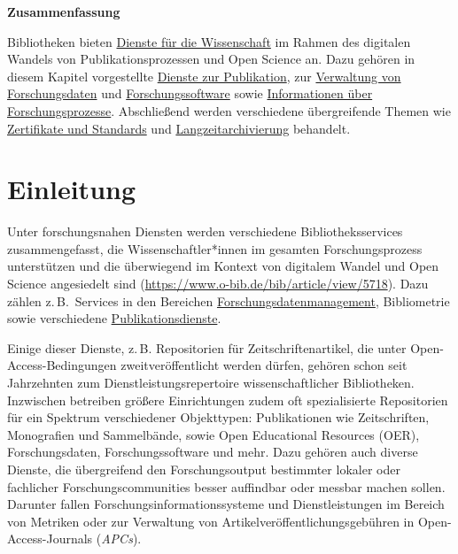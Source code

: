 \documentclass[
  11pt,
  letterpaper,
  DIV=11,
  twoside]{scrreprt}
\begin{document}
\begin{tcolorbox}[enhanced jigsaw, leftrule=.75mm, toprule=.15mm, left=2mm, opacityback=0, arc=.35mm, colback=white, breakable, colframe=quarto-callout-note-color-frame, rightrule=.15mm, bottomrule=.15mm]
\begin{minipage}[t]{5.5mm}
\textcolor{quarto-callout-note-color}{\faInfo}
\end{minipage}%
\begin{minipage}[t]{\textwidth - 5.5mm}

\vspace{-3mm}\textbf{Zusammenfassung}\vspace{3mm}

Bibliotheken bieten \hyperref[einleitung]{Dienste für die Wissenschaft}
im Rahmen des digitalen Wandels von Publikationsprozessen und Open
Science an. Dazu gehören in diesem Kapitel vorgestellte
\hyperref[publikationsdienste]{Dienste zur Publikation}, zur
\hyperref[forschungsdatenmanagement]{Verwaltung von Forschungsdaten} und
\hyperref[forschungssoftware]{Forschungssoftware} sowie
\hyperref[forschungsinformationssysteme]{Informationen über
Forschungsprozesse}. Abschließend werden verschiedene übergreifende
Themen wie \hyperref[zertifikate-und-standards]{Zertifikate und
Standards} und \hyperref[langzeitarchivierung]{Langzeitarchivierung}
behandelt.

\end{minipage}%
\end{tcolorbox}

\section{Einleitung}\label{einleitung-8}

Unter forschungsnahen Diensten werden verschiedene Bibliotheksservices
zusammengefasst, die Wissenschaftler*innen im gesamten Forschungsprozess
unterstützen und die überwiegend im Kontext von digitalem Wandel und
Open Science angesiedelt sind
(\url{https://www.o-bib.de/bib/article/view/5718}). Dazu zählen
z.\,B.~Services in den Bereichen
\hyperref[forschungsdatenmanagement]{Forschungsdatenmanagement},
Bibliometrie sowie verschiedene
\hyperref[publikationsdienste]{Publikationsdienste}.

Einige dieser Dienste, z.\,B. Repositorien für Zeitschriftenartikel, die
unter Open-Access-Bedingungen zweitveröffentlicht werden dürfen, gehören
schon seit Jahrzehnten zum Dienstleistungsrepertoire wissenschaftlicher
Bibliotheken. Inzwischen betreiben größere Einrichtungen zudem oft
spezialisierte Repositorien für ein Spektrum verschiedener Objekttypen:
Publikationen wie Zeitschriften, Monografien und Sammelbände, sowie Open
Educational Resources ({OER}), Forschungsdaten, Forschungssoftware und
mehr. Dazu gehören auch diverse Dienste, die übergreifend den
Forschungsoutput bestimmter lokaler oder fachlicher
Forschungscommunities besser auffindbar oder messbar machen sollen.
Darunter fallen Forschungsinformationssysteme und Dienstleistungen im
Bereich von Metriken oder zur Verwaltung von
Artikelveröffentlichungsgebühren in Open-Access-Journals (\emph{APCs}).
\end{document}
